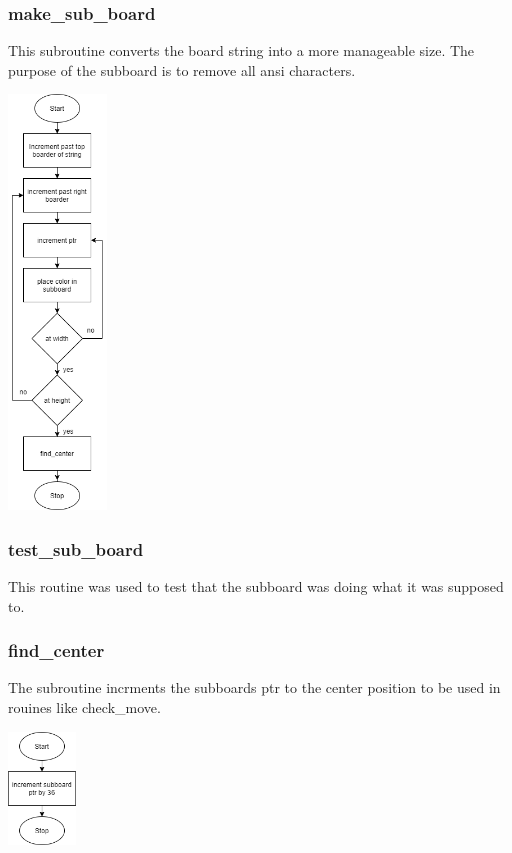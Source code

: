 \documentclass{article}
\begin{document}
    \subsubsection{make\_sub\_board}
        This subroutine converts the board string into a more
        manageable size.  The purpose of the subboard is to remove
        all ansi characters.
        \begin{center}
            {\includegraphics[height=11cm]{make_sub_board.png}\centering} 
        \end{center}
        \newpage

    \subsubsection{test\_sub\_board}
        This routine was used to test that the subboard was doing what
        it was supposed to.

    \subsubsection{find\_center}
        The subroutine incrments the subboards ptr to the center
        position to be used in rouines like check\_move.
        \begin{center}
            {\includegraphics[height=3cm]{find_center.png}\centering} 
        \end{center}
\end{document}

